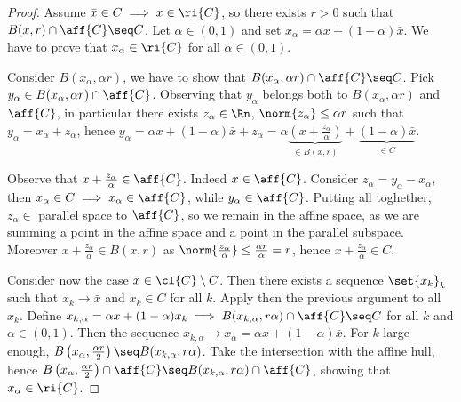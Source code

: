 \begin{proof}
    
    Assume $\bar{x} \in C \implies x \in \ri{C}$, so there exists $r > 0$ such that $B(x,r) \cap \aff{C} \seq C$. Let $\alpha \in (0,1)$ and set $x_\alpha = \alpha x + (1-\alpha)\bar{x}$. We have to prove that $x_\alpha \in \ri{C}$ for all $\alpha \in (0,1)$. 

    Consider $B(x_\alpha,\alpha r)$, we have to show that $B(x_\alpha, \alpha r) \cap \aff{C} \seq C$. Pick $y_\alpha \in B(x_\alpha, \alpha r) \cap \aff{C}$. Observing that $y_\alpha$ belongs both to $B(x_\alpha, \alpha r)$ and $\aff{C}$, in particular there exists $z_\alpha \in \Rn$, $\norm{z_\alpha} \le \alpha r$ such that $y_\alpha = x_\alpha + z_\alpha$, hence $y_\alpha = \alpha x + (1-\alpha)\bar{x} + z_\alpha = \alpha\underbrace{\left(x + \frac{z_\alpha}{\alpha}\right)}_{\in B(x,r)} + \underbrace{(1-\alpha)\bar{x}}_{\in C}$. 

    Observe that $x + \frac{z_\alpha}{\alpha} \in \aff{C}$. Indeed $x \in \aff{C}$. Consider $z_\alpha = y_\alpha - x_\alpha$, then $x_\alpha \in C \implies x_\alpha \in \aff{C}$, while $y_\alpha \in \aff{C}$. Putting all toghether, $z_\alpha \in$ parallel space to $\aff{C}$, so we remain in the affine space, as we are summing a point in the affine space and a point in the parallel subspace. Moreover $x + \frac{z_\alpha}{\alpha} \in B(x,r)$ as $\norm{\frac{z_\alpha}{\alpha}} \le \frac{\alpha r}{\alpha} = r$, hence $ x + \frac{z_\alpha}{\alpha} \in C$. 

    Consider now the case $\bar{x} \in \cl{C} \setminus C$. Then there exists a sequence $\set{x_k}_k$ such that $x_k \to \bar{x}$ and $x_k \in C$ for all $k$. Apply then the previous argument to all $x_k$. Define $x_{k,\alpha} = \alpha x + (1-\alpha)x_k \implies B(x_{k,\alpha},r\alpha) \cap \aff{C} \seq C$ for all $k$ and $\alpha \in (0,1)$. Then the sequence $x_{k,\alpha} \to x_\alpha = \alpha x + (1-\alpha)\bar{x}$. For $k$ large enough, $B\left(x_\alpha,\frac{\alpha r}{2}\right) \seq B(x_{k,\alpha},r\alpha)$. Take the intersection with the affine hull, hence $B\left(x_\alpha,\frac{\alpha r}{2}\right) \cap \aff{C} \seq B(x_{k,\alpha},r\alpha) \cap \aff{C}$, showing that $x_\alpha \in \ri{C}$.

\end{proof}
